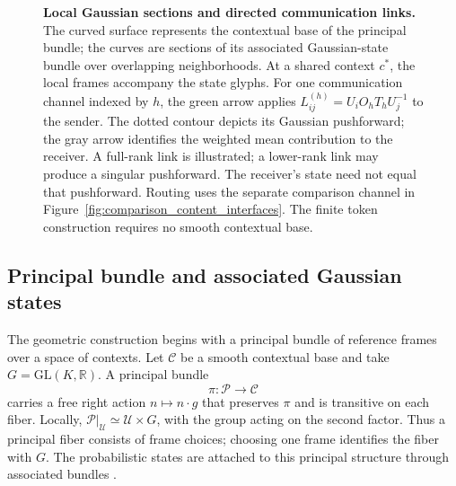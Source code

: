 \documentclass[twoside,11pt]{article}
\begin{document}
\begin{figure}[H]
{\begin{tikzpicture}[ every node/.style={font=\small}]
\end{tikzpicture}
}
\caption{\textbf{Local Gaussian sections and directed communication links.}
The curved surface represents the contextual base of the principal bundle; the curves are sections of its associated Gaussian-state bundle over overlapping neighborhoods. At a shared context \(c^*\), the local frames accompany the state glyphs. For one communication channel indexed by \(h\), the green arrow applies \(L_{ij}^{(h)}=U_iO_hT_hU_j^{-1}\) to the sender. The dotted contour depicts its Gaussian pushforward; the gray arrow identifies the weighted mean contribution to the receiver. A full-rank link is illustrated; a lower-rank link may produce a singular pushforward. The receiver's state need not equal that pushforward. Routing uses the separate comparison channel in Figure~\ref{fig:comparison_content_interfaces}. The finite token construction requires no smooth contextual base.}
\label{fig:link_construction}
\label{fig:bundle_sections_surface}
\end{figure}

\subsection{Principal bundle and associated Gaussian states}
\label{sec:principal_construction}

The geometric construction begins with a principal bundle of reference frames over a space of contexts. Let \(\mathcal C\) be a smooth contextual base and take \(G=\mathrm{GL}(K,\mathbb R)\). A principal bundle
\begin{equation}
\pi:\mathcal P\longrightarrow\mathcal C
\label{eq:principal_bundle}
\end{equation}
carries a free right action \(n\mapsto n\cdot g\) that preserves \(\pi\) and is transitive on each fiber. Locally, \(\mathcal P|_{\mathcal U}\simeq\mathcal U\times G\), with the group acting on the second factor. Thus a principal fiber consists of frame choices; choosing one frame identifies the fiber with \(G\). The probabilistic states are attached to this principal structure through associated bundles \citep{nakahara2003geometry,frankel2011geometry}.
\end{document}
